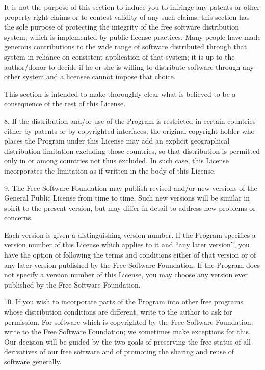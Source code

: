 \item{}It is not the purpose of this section to induce you to infringe
any patents or other property right claims or to contest validity of any
such claims; this section has the sole purpose of protecting the
integrity of the free software distribution system, which is implemented
by public license practices.  Many people have made generous
contributions to the wide range of software distributed through that
system in reliance on consistent application of that system; it is up to
the author/donor to decide if he or she is willing to distribute
software through any other system and a licensee cannot impose that
choice.

\item{}This section is intended to make thoroughly clear what is
believed to be a consequence of the rest of this License.

\item{8.} If the distribution and/or use of the Program is restricted in
certain countries either by patents or by copyrighted interfaces, the
original copyright holder who places the Program under this License
may add an explicit geographical distribution limitation excluding
those countries, so that distribution is permitted only in or among
countries not thus excluded.  In such case, this License incorporates
the limitation as if written in the body of this License.

\item{9.} The Free Software Foundation may publish revised and/or new
versions of the General Public License from time to time.  Such new
versions will be similar in spirit to the present version, but may
differ in detail to address new problems or concerns.

\item{}Each version is given a distinguishing version number.  If the
Program specifies a version number of this License which applies to it
and ``any later version'', you have the option of following the terms
and conditions either of that version or of any later version published
by the Free Software Foundation.  If the Program does not specify a
version number of this License, you may choose any version ever
published by the Free Software Foundation.

\item{10.} If you wish to incorporate parts of the Program into other
free programs whose distribution conditions are different, write to the
author to ask for permission.  For software which is copyrighted by the
Free Software Foundation, write to the Free Software Foundation; we
sometimes make exceptions for this.  Our decision will be guided by the
two goals of preserving the free status of all derivatives of our free
software and of promoting the sharing and reuse of software generally.
\bigskip

